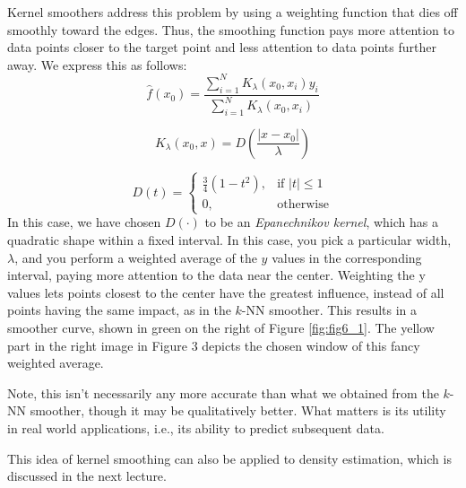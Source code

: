 \documentclass[a4paper]{article}
\begin{document}
Kernel smoothers address this problem by using a weighting function that dies off smoothly toward the edges. Thus, the smoothing function pays more attention to data points closer to the target point and less attention to data points further away. We express this as follows:
$$\widehat{f}(x_0) = \frac{\sum_{i=1}^{N} K_\lambda (x_0, x_i) y_i}{\sum_{i=1}^{N} K_\lambda (x_0, x_i)}$$

$$K_\lambda (x_0, x) = D\left(\frac{|x-x_0|}{\lambda}\right)$$

$$D(t) = \begin{cases}
    \frac{3}{4}({1-t^2}),& \text{if } |t|\leq 1\\
    0,              & \text{otherwise}
\end{cases}$$
In this case, we have chosen $D(\cdot)$ to be an \emph{Epanechnikov kernel}, which has a quadratic shape within a fixed interval.  In this case, you pick a particular width, $\lambda$, and you perform a weighted average of the $y$ values in the corresponding interval, paying more attention to the data near the center.  Weighting the y values lets points closest to the center have the greatest influence, instead of all points having the same impact, as in the $k$-NN smoother. This results in a smoother curve, shown in green on the right of Figure \ref{fig:fig6_1}.  The yellow part in the right image in Figure 3 depicts the chosen window of this fancy weighted average.

Note, this isn't necessarily any more accurate than what we obtained from the $k$-NN smoother, though it may be qualitatively better.  What matters is its utility in real world applications, i.e., its ability to predict subsequent data.

This idea of kernel smoothing can also be applied to density estimation, which is discussed in the next lecture.
\end{document}
